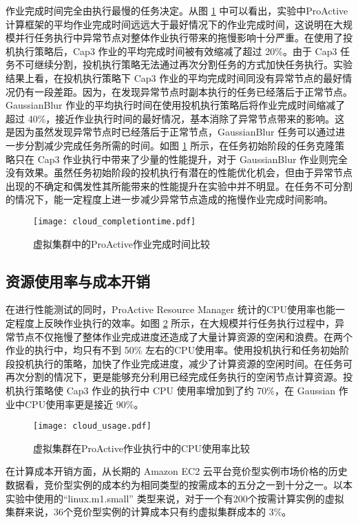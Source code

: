 作业完成时间完全由执行最慢的任务决定。从图 \ref{figure:completiontime_cloud} 中可以看出，实验中ProActive计算框架的平均作业完成时间远远大于最好情况下的作业完成时间，这说明在大规模并行任务执行中异常节点对整体作业执行带来的拖慢影响十分严重。在使用了投机执行策略后，Cap3 作业的平均完成时间被有效缩减了超过 20\%。由于 Cap3 任务不可继续分割，投机执行策略无法通过再次分割任务的方式加快任务执行。实验结果上看，在投机执行策略下 Cap3 作业的平均完成时间同没有异常节点的最好情况仍有一段差距。因为，在发现异常节点时副本执行的任务已经落后于正常节点。GaussianBlur 作业的平均执行时间在使用投机执行策略后将作业完成时间缩减了超过 40\%，接近作业执行时间的最好情况，基本消除了异常节点带来的影响。这是因为虽然发现异常节点时已经落后于正常节点，GaussianBlur 任务可以通过进一步分割减少完成任务所需的时间。如图 \ref{figure:completiontime_cloud} 所示，在任务初始阶段的任务克隆策略只在 Cap3 作业执行中带来了少量的性能提升，对于 GaussianBlur 作业则完全没有效果。虽然任务初始阶段的投机执行有潜在的性能优化机会，但由于异常节点出现的不确定和偶发性其所能带来的性能提升在实验中并不明显。在任务不可分割的情况下，能一定程度上进一步减少异常节点造成的拖慢作业完成时间影响。
\begin{figure}
  \centering
  \texttt{[image: cloud\_completiontime.pdf]}
  \caption{虚拟集群中的ProActive作业完成时间比较}
  \label{figure:completiontime_cloud}
\end{figure}

\subsection{资源使用率与成本开销}
\label{sec:no2_usage}
在进行性能测试的同时，ProActive Resource Manager 统计的CPU使用率也能一定程度上反映作业执行的效率。如图 \ref{figure:resourceusage_cloud} 所示，在大规模并行任务执行过程中，异常节点不仅拖慢了整体作业完成进度还造成了大量计算资源的空闲和浪费。在两个作业的执行中，均只有不到 50\% 左右的CPU使用率。使用投机执行和任务初始阶段投机执行的策略，加快了作业完成进度，减少了计算资源的空闲时间。在任务可再次分割的情况下，更是能够充分利用已经完成任务执行的空闲节点计算资源。投机执行策略使 Cap3 作业的执行中 CPU 使用率增加到了约 70\%，在 Gaussian 作业中CPU使用率更是接近 90\%。
\begin{figure}
  \centering
  \texttt{[image: cloud\_usage.pdf]}
  \caption{虚拟集群在ProActive作业执行中的CPU使用率比较}
  \label{figure:resourceusage_cloud}
\end{figure}

在计算成本开销方面，从长期的 Amazon EC2 云平台竞价型实例市场价格的历史数据看，竞价型实例的成本约为相同类型的按需成本的五分之一到十分之一。以本实验中使用的``linux.m1.small'' 类型来说，对于一个有200个按需计算实例的虚拟集群来说，36个竞价型实例的计算成本只有约虚拟集群成本的 3\%。

